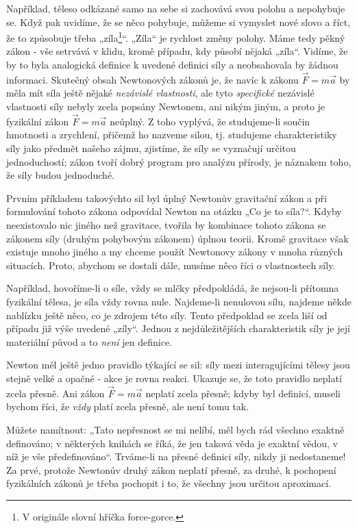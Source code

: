     Například, těleso odkázané samo na sebe si zachovává svou polohu a nepohybuje se. Když pak 
    uvidíme, že se něco pohybuje, můžeme si vymyslet nové slovo a říct, že to způsobuje třeba 
    „zíla\footnote{V originále slovní hříčka force-gorce.}“. „Zíla“ je rychlost změny polohy. Máme 
    tedy pěkný zákon - vše setrvává v klidu, kromě případu, kdy působí nějaká „zíla“. Vidíme, že by 
    to byla analogická definice k uvedené definici síly a neobsahovala by žádnou informaci. 
    Skutečný obsah Newtonových zákonů je, že navíc k zákonu \(\vec{F}= m\vec{a}\) by měla mít síla 
    ještě nějaké \emph{nezávislé vlastnosti}, ale tyto \emph{specifické} nezávislé vlastnosti síly 
    nebyly zcela popsány Newtonem, ani nikým jiným, a proto je fyzikální zákon \(\vec{F}= 
    m\vec{a}\) neúplný. Z toho vyplývá, že studujeme-li součin hmotnosti a zrychlení, přičemž ho 
    nazveme silou, tj. studujeme charakteristiky síly jako předmět našeho zájmu, zjistíme, že síly 
    se vyznačují určitou jednoduchostí; zákon tvoří dobrý program pro analýzu přírody, je náznakem 
    toho, že síly budou jednoduché.
    
    Prvním příkladem takovýchto sil byl úplný Newtonův gravitační zákon a při formulování tohoto 
    zákona odpovídal Newton na otázku „Co je to síla?“. Kdyby neexistovalo nic jiného než 
    gravitace, tvořila by kombinace tohoto zákona se zákonem síly (druhým pohybovým zákonem) úplnou 
    teorii. Kromě gravitace však existuje mnoho jiného a my chceme použít Newtonovy zákony v mnoha 
    různých situacích. Proto, abychom se dostali dále, musíme něco říci o vlastnostech síly.
    
    Například, hovoříme-li o síle, vždy se mlčky předpokládá, že nejsou-li přítomna fyzikální 
    tělesa, je síla vždy rovna nule. Najdeme-li nenulovou sílu, najdeme někde nablízku ještě něco, 
    co je zdrojem této síly. Tento předpoklad se zcela liší od případu již výše uvedené „zíly“. 
    Jednou z nejdůležitějších charakteristik síly je její materiální původ a to \emph{není} jen 
    definice.
    
    Newton měl ještě jedno pravidlo týkající se sil: síly mezi interagujícími tělesy jsou stejně 
    velké a opačné - akce je rovna reakci. Ukazuje se, že toto pravidlo neplatí zcela přesně. Ani 
    zákon \(\vec{F}= m\vec{a}\) neplatí zcela přesně; kdyby byl definicí, museli bychom říci, že 
    \emph{vždy} platí zcela přesně, ale není tomu tak.
    
    Můžete namítnout: „Tato nepřesnost se mi nelíbí, měl bych rád všechno exaktně definováno; v 
    některých knihách se říká, že jen taková věda je exaktní vědou, v níž je vše předefinováno“. 
    Trváme-li na přesné definici síly, nikdy ji nedostaneme! Za prvé, protože Newtonův druhý zákon 
    neplatí přesně, za druhé, k pochopení fyzikálních zákonů je třeba pochopit i to, že všechny 
    jsou určitou aproximací.
    

